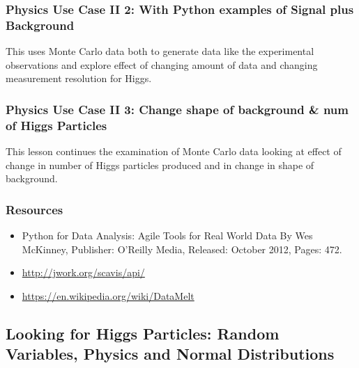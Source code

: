 \subsubsection{Physics Use Case II 2: With Python examples of Signal
plus
Background}\label{physics-use-case-ii-3-with-python-examples-of-signal-plus-background}

This uses Monte Carlo data both to generate data like the experimental
observations and explore effect of changing amount of data and changing
measurement resolution for Higgs.


\subsubsection{Physics Use Case II 3: Change shape of background \& num
of Higgs
Particles}\label{physics-use-case-ii-4-change-shape-of-background-num-of-higgs-particles}

This lesson continues the examination of Monte Carlo data looking at
effect of change in number of Higgs particles produced and in change in
shape of background.


\subsubsection{Resources}\label{resources-1}

\begin{itemize}

\item
  Python for Data Analysis: Agile Tools for Real World Data By Wes
  McKinney, Publisher: O'Reilly Media, Released: October 2012, Pages:
  472.
\item
  \url{http://jwork.org/scavis/api/}
\item
  \url{https://en.wikipedia.org/wiki/DataMelt}
\end{itemize}

\subsection{Looking for Higgs Particles: Random Variables, Physics and
Normal
Distributions}\label{looking-for-higgs-particles-random-variables-physics-and-normal-distributions}

